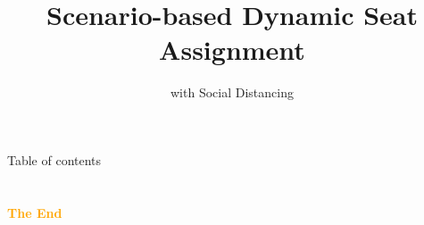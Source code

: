\documentclass[aspectratio=43]{beamer}
\title{Scenario-based Dynamic Seat Assignment} %
\subtitle{with Social Distancing}
\institute[HKUST]{
    IEDA%
    \\%
    The Hong Kong University of Science and Technology%
} %
\date{}
\begin{document}
    \frame{\titlepage}
    \begin{frame}{Table of contents}
        \tableofcontents
    \end{frame}
    
    
    
    
    


    \section{}
    \begin{frame}{}
        \centering
            \Huge\bfseries
        \textcolor{orange}{The End}
    \end{frame}
\end{document}
